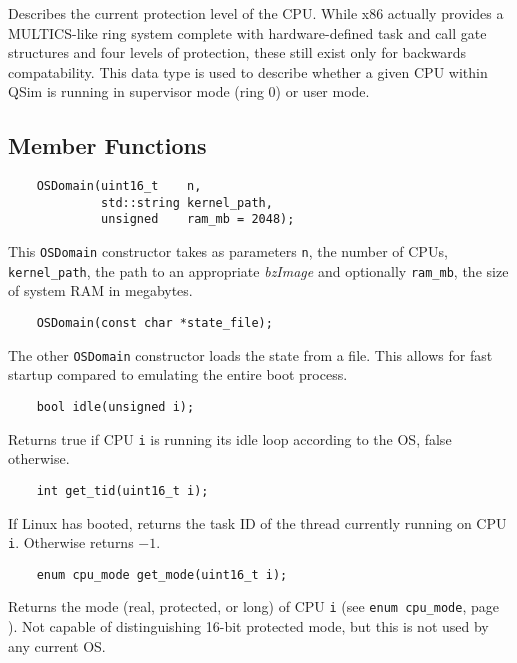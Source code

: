 \documentclass[letterpaper, 10pt]{book}
\begin{document}
Describes the current protection level of the CPU. While x86 actually provides
a MULTICS-like ring system complete with hardware-defined task and call gate
structures and four levels of protection, these still exist only for backwards
compatability. This data type is used to describe whether a given CPU within
QSim is running in supervisor mode (ring 0) or user mode.

\subsection{Member Functions}
\label{func:OSDomain} \begin{verbatim}
    OSDomain(uint16_t    n, 
             std::string kernel_path, 
             unsigned    ram_mb = 2048);
\end{verbatim}

This \texttt{OSDomain} constructor takes as parameters \texttt{n}, the number of
CPUs, \texttt{kernel\_path}, the path to an appropriate \emph{bzImage} and 
optionally \texttt{ram\_mb}, the size of system RAM in megabytes. 

\begin{verbatim}
    OSDomain(const char *state_file);
\end{verbatim}

The other \texttt{OSDomain} constructor loads the state from a file. This allows
for fast startup compared to emulating the entire boot process.

\label{func:idle} \begin{verbatim}
    bool idle(unsigned i);
\end{verbatim}

Returns true if CPU \texttt{i} is running its idle loop according to the OS,
false otherwise.

\label{func:get_tid} \begin{verbatim}
    int get_tid(uint16_t i);
\end{verbatim}

If Linux has booted, returns the task ID of the thread currently running on CPU
\texttt{i}. Otherwise returns $-1$.

\label{func:get_mode} \begin{verbatim}
    enum cpu_mode get_mode(uint16_t i);
\end{verbatim}
Returns the mode (real, protected, or long) of CPU \texttt{i} (see 
\texttt{enum cpu\_mode}, page \pageref{enum:cpu_mode}). Not capable of 
distinguishing 16-bit protected mode, but this is not used by any current OS.
\end{document}
